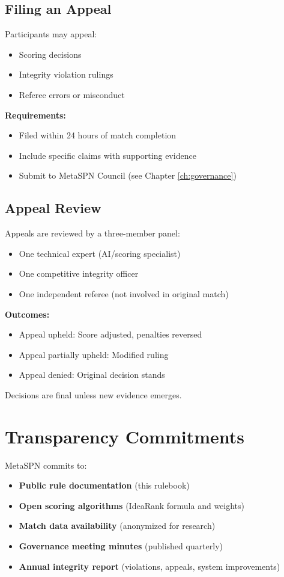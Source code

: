 \subsection{Filing an Appeal}

Participants may appeal:
\begin{itemize}[leftmargin=*]
  \item Scoring decisions
  \item Integrity violation rulings
  \item Referee errors or misconduct
\end{itemize}

\textbf{Requirements:}
\begin{itemize}[leftmargin=*]
  \item Filed within 24 hours of match completion
  \item Include specific claims with supporting evidence
  \item Submit to MetaSPN Council (see Chapter \ref{ch:governance})
\end{itemize}

\subsection{Appeal Review}

Appeals are reviewed by a three-member panel:
\begin{itemize}[leftmargin=*]
  \item One technical expert (AI/scoring specialist)
  \item One competitive integrity officer
  \item One independent referee (not involved in original match)
\end{itemize}

\textbf{Outcomes:}
\begin{itemize}[leftmargin=*]
  \item Appeal upheld: Score adjusted, penalties reversed
  \item Appeal partially upheld: Modified ruling
  \item Appeal denied: Original decision stands
\end{itemize}

Decisions are final unless new evidence emerges.

\section{Transparency Commitments}

MetaSPN commits to:
\begin{itemize}[leftmargin=*]
  \item \textbf{Public rule documentation} (this rulebook)
  \item \textbf{Open scoring algorithms} (IdeaRank formula and weights)
  \item \textbf{Match data availability} (anonymized for research)
  \item \textbf{Governance meeting minutes} (published quarterly)
  \item \textbf{Annual integrity report} (violations, appeals, system improvements)
\end{itemize}

